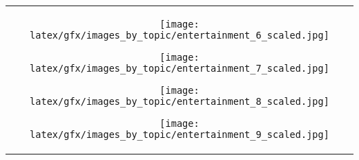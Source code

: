 \begin{table*}[ht]
\begin{tabular}{c}
                    \hfill
                    \begin{minipage}{0.08\textwidth}
                        \centering
                        \texttt{[image: latex/gfx/images\_by\_topic/entertainment\_6\_scaled.jpg]}
                    \end{minipage}
                    \hfill
                    \begin{minipage}{0.08\textwidth}
                        \centering
                        \texttt{[image: latex/gfx/images\_by\_topic/entertainment\_7\_scaled.jpg]}
                    \end{minipage}
                    \begin{minipage}{0.08\textwidth}
                        \centering
                        \texttt{[image: latex/gfx/images\_by\_topic/entertainment\_8\_scaled.jpg]}
                    \end{minipage}
                    \begin{minipage}{0.08\textwidth}
                        \centering
                        \texttt{[image: latex/gfx/images\_by\_topic/entertainment\_9\_scaled.jpg]}
                    \end{minipage}
                \\
    

\end{tabular}
\end{table*}
